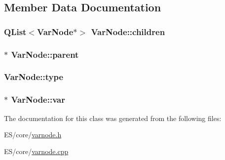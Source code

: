 \subsection{Member Data Documentation}
\hypertarget{class_var_node_a8768caf8ce89a4a85ccb6600d8938be9}{
\subsubsection[{children}]{\setlength{\rightskip}{0pt plus 5cm}QList$<${\bf VarNode}$\ast$$>$ {\bf VarNode::children}}}
\label{class_var_node_a8768caf8ce89a4a85ccb6600d8938be9}
\hypertarget{class_var_node_a161c85b938b0ca27ee263ec70394dcca}{
\subsubsection[{parent}]{$\ast$ {\bf VarNode::parent}}}
\label{class_var_node_a161c85b938b0ca27ee263ec70394dcca}
\hypertarget{class_var_node_ac8a7356019869b99be0dad760909e510}{
\subsubsection[{type}]{ {\bf VarNode::type}}}
\label{class_var_node_ac8a7356019869b99be0dad760909e510}
\hypertarget{class_var_node_a3fbf3232482e35a5d1e2bfb2ac58bc47}{
\subsubsection[{var}]{$\ast$ {\bf VarNode::var}}}
\label{class_var_node_a3fbf3232482e35a5d1e2bfb2ac58bc47}


The documentation for this class was generated from the following files:\begin{DoxyCompactItemize}
\item 
ES/core/\hyperlink{varnode_8h}{varnode.h}\item 
ES/core/\hyperlink{varnode_8cpp}{varnode.cpp}\end{DoxyCompactItemize}
